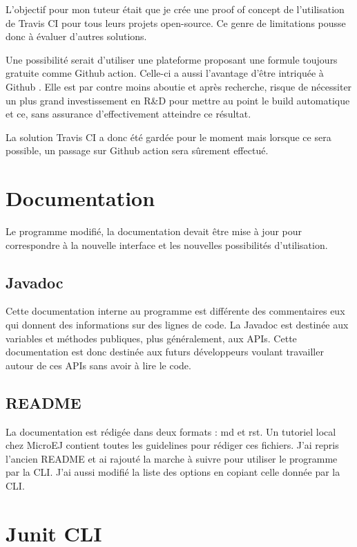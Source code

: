 \documentclass[french,a4paper,12pt]{report}
\begin{document}
L’objectif pour mon tuteur était que je crée une proof of concept de l’utilisation de Travis CI pour tous leurs projets open-source. Ce genre de limitations pousse donc à évaluer d'autres solutions.

Une possibilité serait d’utiliser une plateforme proposant une formule toujours gratuite comme Github action. Celle-ci a aussi l’avantage d’être intriquée à Github . Elle est par contre moins aboutie et après recherche, risque de nécessiter un plus grand investissement en R\&D pour mettre au point le build automatique et ce, sans assurance d’effectivement atteindre ce résultat.

La solution Travis CI a donc été gardée pour le moment mais lorsque ce sera possible, un passage sur Github action sera sûrement effectué.

\section{Documentation}

Le programme modifié, la documentation devait être mise à jour pour correspondre à la nouvelle interface et les nouvelles possibilités d’utilisation.

\subsection{Javadoc}

Cette documentation interne au programme est différente des commentaires eux qui donnent des informations sur des lignes de code. La Javadoc est destinée aux variables et méthodes publiques, plus généralement, aux APIs. Cette documentation est donc destinée aux futurs développeurs voulant travailler autour de ces APIs sans avoir à lire le code.

\subsection{README}

La documentation est rédigée dans deux formats : md et rst. Un tutoriel local chez MicroEJ contient toutes les guidelines pour rédiger ces fichiers. J'ai repris l'ancien README et ai rajouté la marche à suivre pour utiliser le programme par la CLI. J'ai aussi modifié la liste des options en copiant celle donnée par la CLI. 

\section{Junit CLI}
\end{document}
